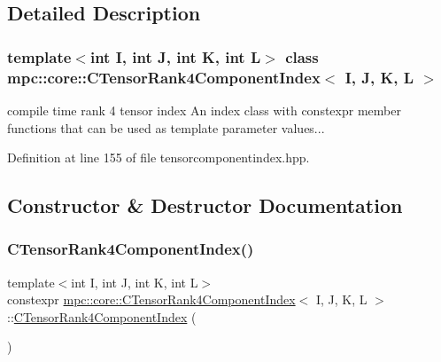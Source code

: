 \subsection{Detailed Description}
\subsubsection*{template$<$int I, int J, int K, int L$>$\newline
class mpc\+::core\+::\+C\+Tensor\+Rank4\+Component\+Index$<$ I, J, K, L $>$}

compile time rank 4 tensor index An index class with constexpr member functions that can be used as template parameter values... 

Definition at line 155 of file tensorcomponentindex.\+hpp.



\subsection{Constructor \& Destructor Documentation}
\mbox{\label{classmpc_1_1core_1_1_c_tensor_rank4_component_index_aeaca64a48e159b69fe5a31df70ad2f32}} 
\subsubsection{\texorpdfstring{C\+Tensor\+Rank4\+Component\+Index()}{CTensorRank4ComponentIndex()}\hspace{0.1cm}{\footnotesize\ttfamily [1/2]}}
{\footnotesize\ttfamily template$<$int I, int J, int K, int L$>$ \\
constexpr \mbox{\hyperlink{classmpc_1_1core_1_1_c_tensor_rank4_component_index}{mpc\+::core\+::\+C\+Tensor\+Rank4\+Component\+Index}}$<$ I, J, K, L $>$\+::\mbox{\hyperlink{classmpc_1_1core_1_1_c_tensor_rank4_component_index}{C\+Tensor\+Rank4\+Component\+Index}} (\begin{DoxyParamCaption}{ }\end{DoxyParamCaption})\hspace{0.3cm}{\ttfamily [inline]}}



